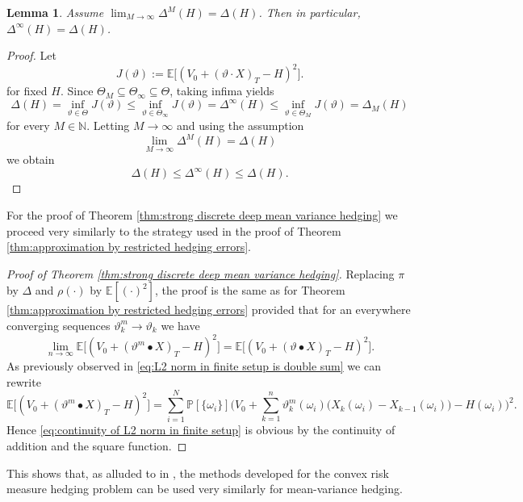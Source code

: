 \documentclass[11pt,a4paper,twoside,openany]{report}
\numberwithin{equation}{section}
\theoremstyle{plain} %
\newtheorem{lemma}[theorem]{Lemma}
\theoremstyle{definition} %
\theoremstyle{remark} %
\let\parencite\authnumparencite
\begin{document}
\begin{lemma}\label{lemma:strong form implies weak form}
    Assume \(\lim_{M\to\infty}\Delta^M(H)=\Delta(H)\).  Then in particular, \(\Delta^{\infty}(H)=\Delta(H)\).
\end{lemma}
\begin{proof}
Let
\[
J(\vartheta):=\mathbb{E}\Big[(V_0+(\vartheta\cdot X)_T-H)^2\Big].
\]
for fixed \(H\).
Since \(\Theta_M\subseteq \Theta_\infty\subseteq \Theta\), taking infima yields
\[
\Delta(H)=\inf_{\vartheta\in\Theta}J(\vartheta)
\leq
\inf_{\vartheta\in\Theta_\infty}J(\vartheta)
=
\Delta^\infty(H)
\leq
\inf_{\vartheta\in\Theta_M}J(\vartheta)
=
\Delta_M(H)
\]
for every \(M\in\mathbb N\). Letting \(M\to\infty\) and using the assumption
\[
\lim_{M\to\infty}\Delta^M(H)=\Delta(H)
\]
we obtain
\[
\Delta(H)\leq \Delta^\infty(H)\leq \Delta(H).
\]
\end{proof}
For the proof of Theorem \ref{thm:strong discrete deep mean variance hedging} we proceed very similarly to the strategy used in the proof of Theorem \ref{thm:approximation by restricted hedging errors}.
\begin{proof}[Proof of Theorem \ref{thm:strong discrete deep mean variance hedging}]
Replacing \(\pi\) by \(\Delta\) and \(\rho(\cdot)\) by \(\mathbb{E}[(\cdot)^2]\), the proof is the same as for Theorem \ref{thm:approximation by restricted hedging errors} provided that for an everywhere converging sequences \(\vartheta_k^m\to\vartheta_k\) we have
\begin{equation}\label{eq:continuity of L2 norm in finite setup}
    \lim_{n\to\infty}\mathbb{E}\Big[(V_0+(\vartheta^m\bullet X)_T-H)^2\Big]=\mathbb{E}\Big[(V_0+(\vartheta\bullet X)_T-H)^2\Big].
\end{equation}
As previously observed in \eqref{eq:L2 norm in finite setup is double sum} we can rewrite 
\begin{equation*}
    \mathbb{E}\Big[(V_0+(\vartheta^m\bullet X)_T-H)^2\Big]=\sum_{i=1}^N\mathbb{P}[\{\omega_i\}]\bigg( V_0+\sum_{k=1}^n\vartheta_k^m(\omega_i)\Big(X_k(\omega_i)-X_{k-1}(\omega_i)\Big)-H(\omega_i)\bigg)^2.
\end{equation*}
Hence \eqref{eq:continuity of L2 norm in finite setup} is obvious by the continuity of addition and the square function.
\end{proof}
This shows that, as alluded to in \parencite[Remark~3.4]{Buehler2018DeepHedging}, the methods developed for the convex risk measure hedging problem can be used very similarly for mean-variance hedging.
\end{document}
